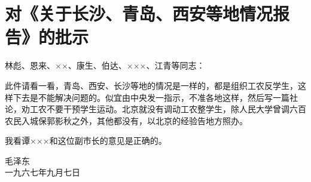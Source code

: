 \section[对《关于长沙、青岛、西安等地情况报告》的批示（一九六六年九月七日）]{对《关于长沙、青岛、西安等地情况报告》的批示}


林彪、恩来、××、康生、伯达、×××、江青等同志：

此件请看一看，青岛、西安、长沙等地的情况是一样的，都是组织工农反学生，这样下去是不能解决问题的。似宜由中央发一指示，不准各地这样，然后写一篇社论，劝工农不要干预学生运动。北京就没有调动工农整学生，除人民大学曾调六百农民入城保郭影秋之外，其他都没有，以北京的经验告地方照办。

我看谭×××和这位副市长的意见是正确的。

{\raggedleft 毛泽东\\一九六七年九月七日\par}


